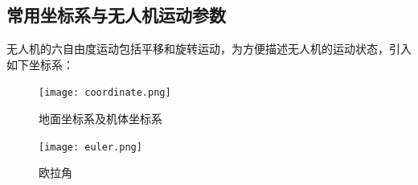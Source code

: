 \subsection{常用坐标系与无人机运动参数}
\label{sec:1}
无人机的六自由度运动包括平移和旋转运动，为方便描述无人机的运动状态，引入如下坐标系：
\begin{figure}[htbp]
    \centering
    \begin{minipage}{.49\linewidth}
        \centering
        \texttt{[image: coordinate.png]}
        \caption{地面坐标系及机体坐标系}
        \label{fig:coordinate}
    \end{minipage}
    \hfill
    \begin{minipage}{.49\linewidth}
        \centering
        \texttt{[image: euler.png]}
        \caption{欧拉角}
        \label{fig:euler}
    \end{minipage}
\end{figure}

